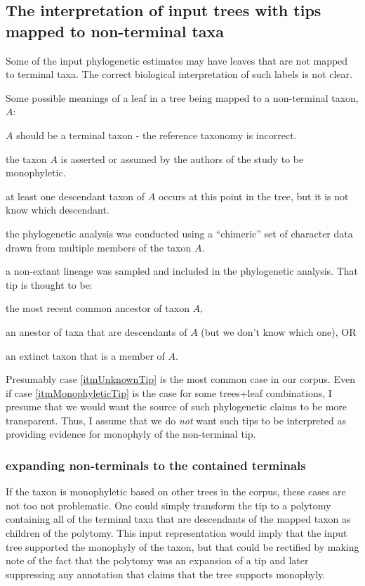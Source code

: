 \documentclass[11pt]{article}
\begin{document}
\subsection{The interpretation of input trees with tips mapped to non-terminal taxa}
Some of the input phylogenetic estimates may have leaves that are not mapped to terminal taxa.
The correct biological interpretation of such labels is not clear.

Some possible meanings of a leaf in a tree being mapped to a non-terminal taxon, $A$:
\begin{compactenum}
    \item $A$ should be a terminal taxon - the reference taxonomy is incorrect.
    \item the taxon $A$ is asserted or assumed by the authors of the study to be monophyletic.\label{itmMonophyleticTip}
    \item at least one descendant taxon of $A$ occurs at this point in the tree, but it is not know which descendant.\label{itmUnknownTip}
    \item the phylogenetic analysis was conducted using a ``chimeric'' set of character data drawn from multiple
        members of the taxon $A$.
    \item a non-extant lineage was sampled and included in the phylogenetic analysis. That tip is thought to be:
    \begin{compactenum}
        \item the most recent common ancestor of taxon $A$,
        \item an anestor of taxa that are descendants of $A$ (but we don't know which one), OR
        \item an extinct taxon that is a member of $A$.
    \end{compactenum}
\end{compactenum}
Presumably case \ref{itmUnknownTip} is the most common case in our corpus.
Even if case \ref{itmMonophyleticTip} is the case for some trees+leaf combinations, I presume
    that we would want the source of such phylogenetic claims to be more transparent.
Thus, I assume that we do {\em not} want such tips to be interpreted as providing evidence
    for monophyly of the non-terminal tip.

\subsubsection{expanding non-terminals to the contained terminals}
If the taxon is monophyletic based on other trees in the corpus, these cases are not too not problematic.
One could simply transform the tip to a polytomy containing all of the terminal taxa that are
    descendants of the mapped taxon as children of the polytomy.
This input representation would imply that the input tree supported the monophyly of the taxon, but 
    that could be rectified by making note of the fact that the polytomy was an expansion of a tip
    and later suppressing any annotation that claims that the tree supports monophyly.
\end{document}
